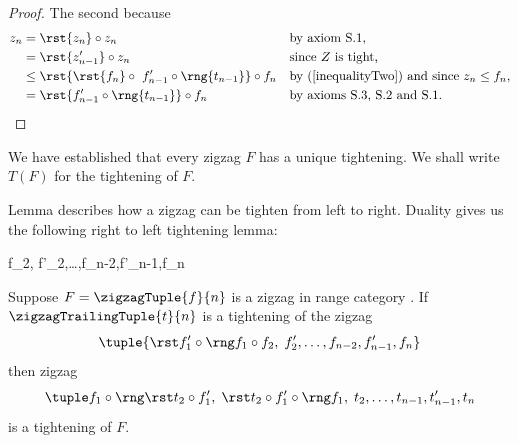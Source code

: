 {\begin{proof}
The second  because
\begin{align*}
 z_n &= \rst{z_n} \circ z_n
         &&\mbox{by axiom S.1,}\\        
     &=  \rst{z'_{n-1}} \circ z_n 
         &&\mbox{since $Z$ is tight,}\\
     &\leq  \rst{\rst{f_n} \circ\ f'_{n-1} \circ \rng{t_{n-1}}} \circ f_n
         &&\mbox{by (\ref{inequalityTwo}) and since $z_n \leq f_n$,} \\
         &= \rst{f'_{n-1} \circ \rng{t_{n-1}}} \circ f_n
         && \mbox{by axioms S.3, S.2 and S.1.}
\end{align*}
\end{proof}
} %
We have established that every zigzag $F$ has a unique tightening. 
We shall write $T(F)$ for the tightening of $F$. 


Lemma  describes how a zigzag can be tighten from left to right. Duality gives us the following right to left tightening lemma:

{%
    {}
    {}
  \circ f_2,\;
  f'_2,\ldots,f_{n-2},f'_{n-1},f_n
}
{%
}
\begin{lemma}
Suppose  $F=\zigzagTuple{f}{n}$ is a zigzag in range category \catcw.
If  $\zigzagTrailingTuple{t}{n}$ is a tightening of the zigzag
\begin{equation}
\label{inductionRLprecursor}
\tuple{\tightTail}
\end{equation}
then  zigzag
\begin{equation}
\label{requiredRLTightening}\rightToLeftTightening
\end{equation}
is a tightening of $F$. 
\end{lemma}

